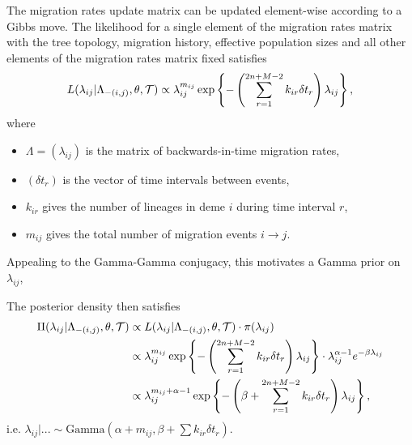 The migration rates update matrix can be updated element-wise according to a Gibbs move. The likelihood for a single element of the migration rates matrix with the tree topology, migration history, effective population sizes and all other elements of the migration rates matrix fixed satisfies
	\[
		L(\lambda_{ij} | \Lambda_{-(i,j)}, \theta, \mathcal{T}) \propto \lambda_{ij}^{m_{ij}} \exp \left\{ - \left(\sum_{r=1}^{2n + M - 2} k_{ir} \delta t_r \right) \lambda_{ij} \right\},
	\]
where
	\begin{itemize}
		\item $\Lambda = (\lambda_{ij})$ is the matrix of backwards-in-time migration rates,
		\item $(\delta t_r)$ is the vector of time intervals between events,
		\item $k_{ir}$ gives the number of lineages in deme $i$ during time interval $r$,
		\item $m_{ij}$ gives the total number of migration events $i \rightarrow j$.
	\end{itemize}

Appealing to the Gamma-Gamma conjugacy, this motivates a Gamma prior on $\lambda_{ij}$, 


The posterior density then satisfies
	\begin{align*}
		\Pi(\lambda_{ij} | \Lambda_{-(i,j)}, \theta, \mathcal{T}) & \propto L(\lambda_{ij} | \Lambda_{-(i,j)}, \theta, \mathcal{T}) \cdot \pi(\lambda_{ij}) \\
			& \propto \lambda_{ij}^{m_{ij}} \exp \left\{ - \left(\sum_{r=1}^{2n + M - 2} k_{ir} \delta t_r \right) \lambda_{ij} \right\} \cdot \lambda_{ij}^{\alpha - 1} e^{-\beta \lambda_{ij}} \\
			& \propto \lambda_{ij}^{m_{ij} + \alpha - 1} \exp \left\{ - \left( \beta + \sum_{r=1}^{2n + M - 2} k_{ir} \delta t_r \right) \lambda_{ij} \right\},
	\end{align*}
i.e. $\lambda_{ij} | ... \sim \text{Gamma} \left( \alpha + m_{ij}, \beta + \sum k_{ir} \delta t_r \right)$.
